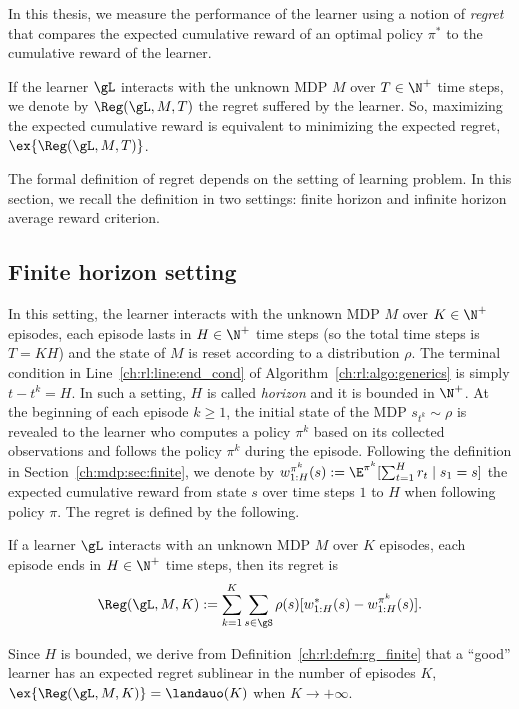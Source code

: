 In this thesis, we measure the performance of the learner using a notion of \emph{regret} that compares the expected cumulative reward of an optimal policy $\pi^*$ to the cumulative reward of the learner. 

If the learner $\gL$ interacts with the unknown MDP $M$ over $T\in\N^+$ time steps, we denote by $\Reg(\gL, M, T)$ the regret suffered by the learner.
So, maximizing the expected cumulative reward is equivalent to minimizing the expected regret, $\ex{\Reg(\gL, M, T)}$.

The formal definition of regret depends on the setting of learning problem.
In this section, we recall the definition in two settings: finite horizon and infinite horizon average reward criterion.

\subsection{Finite horizon setting}
\label{ch:rl:ssec:finite}

In this setting, the learner interacts with the unknown MDP $M$ over $K\in\N^+$ episodes, each episode lasts in $H\in\N^+$ time steps (so the total time steps is $T=KH$) and the state of $M$ is reset according to a distribution $\rho$.
The terminal condition in Line~\ref{ch:rl:line:end_cond} of Algorithm~\ref{ch:rl:algo:generics} is simply $t-t^k=H$.
In such a setting, $H$ is called \emph{horizon} and it is bounded in $\N^+$.
At the beginning of each episode $k\ge1$, the initial state of the MDP $s_{t^k}\sim\rho$ is revealed to the learner who computes a policy $\pi^k$ based on its collected observations and follows the policy $\pi^k$ during the episode.
Following the definition in Section~\ref{ch:mdp:sec:finite}, we denote by $w^{\pi^k}_{1:H}(s):=\E^{\pi^k}[\sum_{t=1}^{H}r_t \mid s_1=s]$ the expected cumulative reward from state $s$ over time steps $1$ to $H$ when following policy $\pi$.
The regret is defined by the following.
\begin{defn}
    If a learner $\gL$ interacts with an unknown MDP $M$ over $K$ episodes, each episode ends in $H\in\N^+$ time steps, then its regret is
    \begin{equation}
        \label{eq:rg_finite}
        \Reg(\gL, M, K):= \sum_{k=1}^K\sum_{s\in\gS}\rho(s)[w^*_{1:H}(s) -w^{\pi^k}_{1:H}(s)].
    \end{equation}
    \label{ch:rl:defn:rg_finite}
\end{defn}
Since $H$ is bounded, we derive from Definition~\ref{ch:rl:defn:rg_finite} that a ``good'' learner has an expected regret sublinear in the number of episodes $K$, $\ex{\Reg(\gL, M, K)}=\landauo(K)$ when $K\to+\infty$.


